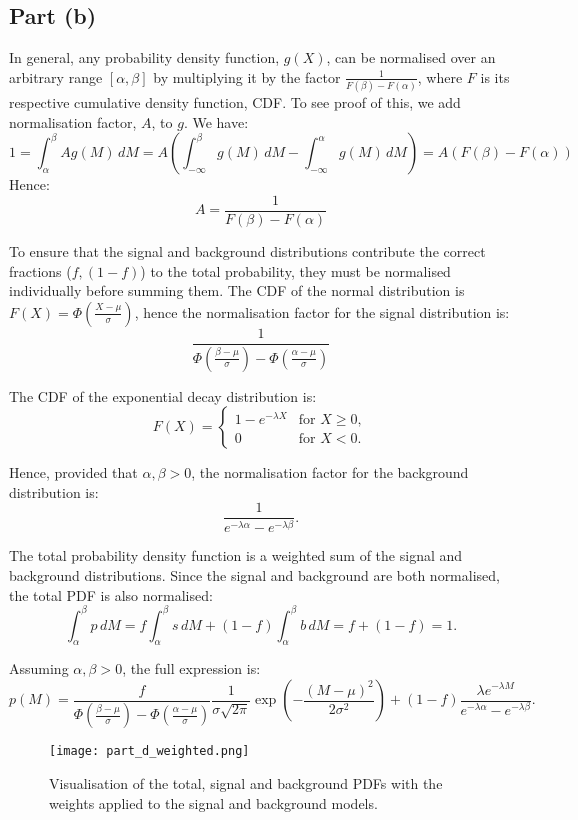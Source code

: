 \documentclass{article}
\begin{document}
\subsection*{Part (b)}

In general, any probability density function, $g(X)$, can be normalised over an arbitrary range $[\alpha, \beta]$ by multiplying it by the factor $\frac{1}{F(\beta) - F(\alpha)}$, where $F$ is its respective cumulative density function, CDF. To see proof of this, we add normalisation factor, $A$, to $g$. We have:
$$
1 = \int_{\alpha}^{\beta} Ag(M) \, dM 
= A\left(\int_{-\infty}^{\beta} g(M) \, dM - \int_{-\infty}^{\alpha} g(M) \, dM \right)
= A(F(\beta) - F(\alpha))
$$
Hence:
$$
A = \frac{1}{F(\beta) - F(\alpha)}
$$

To ensure that the signal and background distributions contribute the correct fractions ($f, (1-f)$) to the total probability, they must be normalised individually before summing them. The CDF of the normal distribution is $F(X) = \Phi(\frac{X-\mu}{\sigma})$, hence the normalisation factor for the signal distribution is:
$$
\frac{1}{\Phi(\frac{\beta-\mu}{\sigma}) - \Phi(\frac{\alpha-\mu}{\sigma})}
$$

The CDF of the exponential decay distribution is:
$$
F(X) = 
\begin{cases} 
1 - e^{-\lambda X} & \text{for } X \geq 0, \\
0 & \text{for } X < 0.
\end{cases}
$$

Hence, provided that $\alpha, \beta > 0$, the normalisation factor for the background distribution is:
$$
\frac{1}{e^{-\lambda\alpha} - e^{-\lambda \beta}}.
$$

The total probability density function is a weighted sum of the signal and background distributions. Since the signal and background are both normalised, the total PDF is also normalised:
\[ 
\int_{\alpha}^{\beta} p \, dM = 
f\int_{\alpha}^{\beta} s \, dM + 
(1-f)\int_{\alpha}^{\beta} b \, dM
= f + (1-f) = 1.
\]

Assuming $\alpha, \beta > 0$, the full expression is:
\[
p(M) = 
\frac{f}{\Phi(\frac{\beta-\mu}{\sigma}) - \Phi(\frac{\alpha-\mu}{\sigma})}
\frac{1}{\sigma\sqrt{2\pi}}
\exp\left(-\frac{(M - \mu)^2}{2\sigma^2}\right)
+
(1-f)
\frac{\lambda e^{-\lambda M}}
{e^{-\lambda\alpha} - e^{-\lambda\beta}}
.
\]

\begin{figure}[h]
\centering
\texttt{[image: part\_d\_weighted.png]}
\caption{Visualisation of the total, signal and background PDFs with the weights applied to the signal and background models.}
\label{fig:dWeighted}
\end{figure}
\end{document}
